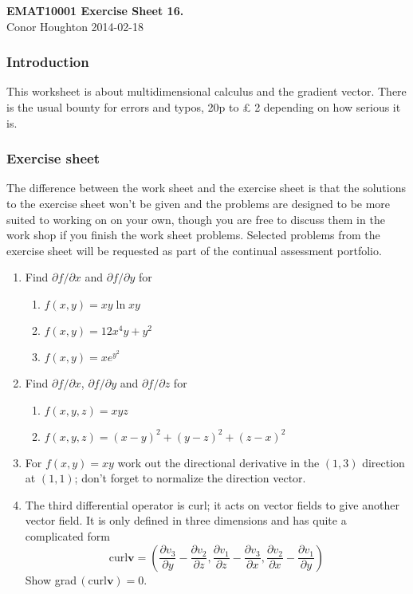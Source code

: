 \documentclass[12pt]{article}
\begin{document}
\begin{center}
{\bf EMAT10001 Exercise Sheet 16.}\\[1cm]{} Conor Houghton 2014-02-18
\end{center}
\subsubsection*{Introduction} 
This worksheet is about multidimensional calculus and the gradient
vector. There is the usual bounty for errors and typos, 20p to \pounds
2 depending on how serious it is.

\subsubsection*{Exercise sheet}

The difference between the work sheet and the exercise sheet is that
the solutions to the exercise sheet won't be given and the problems
are designed to be more suited to working on on your own, though you
are free to discuss them in the work shop if you finish the work sheet
problems. Selected problems from the exercise sheet will be requested
as part of the continual assessment portfolio.

\begin{enumerate}


\item Find $\partial f/\partial x$ and $\partial f/\partial y$ for 
\begin{enumerate}
\item $f(x,y)=xy\ln{xy}$
\item $f(x,y)=12x^4y+y^2$
\item $f(x,y)=xe^{y^2}$
\end{enumerate}


\item Find $\partial f/\partial x$, $\partial f/\partial y$ and $\partial f/\partial z$ for 
\begin{enumerate}
\item $f(x,y,z)=xyz$
\item $f(x,y,z)=(x-y)^2+(y-z)^2+(z-x)^2$
\end{enumerate}

\item For $f(x,y)=xy$ work out the directional
  derivative in the $(1,3)$ direction at $(1,1)$; don't forget to
  normalize the direction vector.

\item The third differential operator is curl; it acts on vector
  fields to give another vector field. It is only defined in three
  dimensions and has quite a complicated form
\begin{equation}
\mbox{curl}\mathbf{v}=\left(\frac{\partial v_3}{\partial y}-\frac{\partial v_2}{\partial z},\frac{\partial v_1}{\partial z}-\frac{\partial v_3}{\partial x},\frac{\partial v_2}{\partial x}-\frac{\partial v_1}{\partial y}\right)
\end{equation}
Show grad$\,(\mbox{curl}\mathbf{v})=0$.

\end{enumerate}
\end{document}
